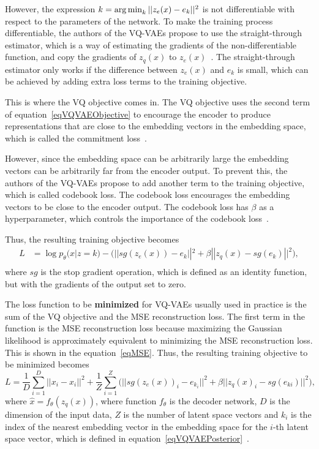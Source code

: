 However, the expression $k = \operatorname*{arg\,min}_{k} || z_e(x) - e_k ||^2$ is not differentiable with respect to the parameters of the network. To make the training process differentiable, the authors of the VQ-VAEs propose to use the straight-through estimator, which is a way of estimating the gradients of the non-differentiable function, and copy the gradients of $z_q(x)$ to $z_e(x)$~\cite{vqvae}. The straight-through estimator only works if the difference between $z_e(x)$ and $e_k$ is small, which can be achieved by adding extra loss terms to the training objective.~\cite{straight_through}

This is where the VQ objective comes in. The VQ objective uses the second term of equation~\ref{eqVQVAEObjective} to encourage the encoder to produce representations that are close to the embedding vectors in the embedding space, which is called the commitment loss~\cite{vqvae}.

However, since the embedding space can be arbitrarily large the embedding vectors can be arbitrarily far from the encoder output. To prevent this, the authors of the VQ-VAEs propose to add another term to the training objective, which is called codebook loss. The codebook loss encourages the embedding vectors to be close to the encoder output. The codebook loss has $\beta$ as a hyperparameter, which controls the importance of the codebook loss~\cite{vqvae}.

Thus, the resulting training objective becomes
\begin{equation} \label{eqVQVAEObjective}
    \begin{split}
        L &= \log p_{\theta}(x|z = k) - \biggl( || sg(z_e(x)) - e_k ||^2 + \beta || z_q(x) - sg(e_k) ||^2 \biggr),\\
    \end{split}
\end{equation}
where $sg$ is the stop gradient operation, which is defined as an identity function, but with the gradients of the output set to zero.

The loss function to be \textbf{minimized} for VQ-VAEs usually used in practice is the sum of the VQ objective and the MSE reconstruction loss.
The first term in the function is the MSE reconstruction loss because maximizing the Gaussian likelihood is approximately equivalent to minimizing the MSE reconstruction loss. This is shown in the equation~\ref{eqMSE}. 
Thus, the resulting training objective to be minimized becomes
\[ L = \frac{1}{D} \sum_{i=1}^{D} ||x_i - \hat{x}_i ||^2 + \frac{1}{Z} \sum_{i=1}^{Z} \biggl( || sg(z_e(x))_i - e_{k_{i}} ||^2 + \beta || z_q(x)_i -  sg(e_{k{i}}) ||^2 \biggr), \]
where $\hat{x} = f_{\theta}(z_q(x))$, where function $f_{\theta}$ is the decoder network, $D$ is the dimension of the input data, $Z$ is the number of latent space vectors and $k_{i}$ is the index of the nearest embedding vector in the embedding space for the $i$-th latent space vector, which is defined in equation~\ref{eqVQVAEPosterior}~\cite{vqvae}.

